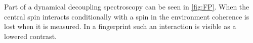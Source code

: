 Part of a dynamical decoupling spectroscopy can be seen in \cref{fig:FP}.
When the central spin interacts conditionally with a spin in the environment coherence is lost when it is measured.
In a fingerprint such an interaction is visible as a lowered contrast.


\begin{figure}[htbp]

    \begin{subfigure}[t]{\textwidth}\centering
        \caption{}
        \label{fig:FP16}
    \end{subfigure}

    \begin{subfigure}[t]{\textwidth}\centering


\end{subfigure}
\end{figure}

